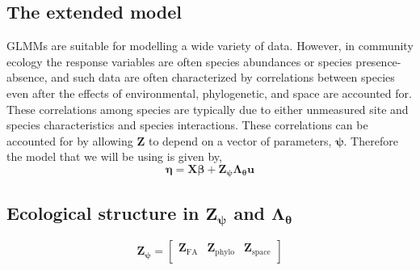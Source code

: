 \documentclass{article}
\newcommand{\dnorm}{\mathcal{N}}
\begin{document}
\subsection{The extended model}

GLMMs are suitable for modelling a wide variety of data.  However, in
community ecology the response variables are often species abundances
or species presence-absence, and such data are often characterized by
correlations between species even after the effects of environmental,
phylogenetic, and space are accounted for.  These correlations among
species are typically due to either unmeasured site and species
characteristics and species interactions.  These correlations can be
accounted for by allowing $\bm Z$ to depend on a vector of parameters,
$\bm\psi$.  Therefore the model that we will be using is given by,
\begin{equation}
  \label{eq:6}
  \bm\eta = \bm X\bm\beta + \bm Z_{\bm\psi}\bm\Lambda_{\bm\theta}\bm u
\end{equation}

\subsection{Ecological structure in $\bm Z_{\bm\psi}$ and
  $\bm\Lambda_{\bm\theta}$}

\begin{equation}
  \label{eq:11}
  \bm Z_{\bm\psi} =
  \begin{bmatrix}
    \bm Z_{\mathrm{FA}} & \bm Z_{\mathrm{phylo}} & \bm
    Z_{\mathrm{space}} \\
  \end{bmatrix}
\end{equation}




\end{document}
